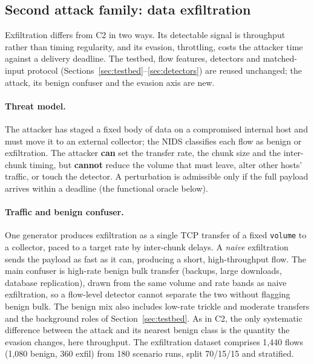 \documentclass[preprint,12pt]{elsarticle}
\begin{document}
\subsection{Second attack family: data exfiltration}
\label{sec:exfil-method}
Exfiltration differs from C2 in two ways. Its detectable signal is throughput rather than timing
regularity, and its evasion, throttling, costs the attacker time against a delivery deadline. The
testbed, flow features, detectors and matched-input protocol
(Sections~\ref{sec:testbed}--\ref{sec:detectors}) are reused unchanged; the attack, its benign
confuser and the evasion axis are new.

\paragraph{Threat model.} The attacker has staged a fixed body of data on a compromised internal host
and must move it to an external collector; the NIDS classifies each flow as benign or exfiltration.
The attacker \textbf{can} set the transfer rate, the chunk size and the inter-chunk timing, but
\textbf{cannot} reduce the volume that must leave, alter other hosts' traffic, or touch the detector. A
perturbation is admissible only if the full payload arrives within a deadline (the functional oracle
below).

\paragraph{Traffic and benign confuser.} One generator produces exfiltration as a single TCP transfer
of a fixed \texttt{volume} to a collector, paced to a target rate by inter-chunk delays. A \emph{naive}
exfiltration sends the payload as fast as it can, producing a short, high-throughput flow. The main
confuser is high-rate benign bulk transfer (backups, large downloads, database replication), drawn from
the same volume and rate bands as naive exfiltration, so a flow-level detector cannot separate the two
without flagging benign bulk. The benign mix also includes low-rate trickle and moderate transfers and
the background roles of Section~\ref{sec:testbed}. As in C2, the only systematic difference between the
attack and its nearest benign class is the quantity the evasion changes, here throughput. The
exfiltration dataset comprises 1{,}440 flows (1{,}080 benign, 360 exfil) from 180 scenario runs, split
70/15/15 and stratified.
\end{document}
